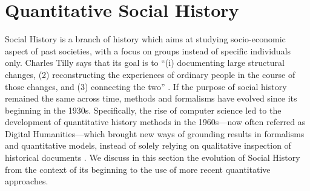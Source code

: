 


\section{Quantitative Social History}\label{sec:social-history}


Social History is a branch of history which aims at studying socio-economic aspect of past societies, with a focus on groups instead of specific individuals only.
Charles Tilly says that its goal is to ``(i) documenting large structural changes, (2) reconstructing the experiences of ordinary people in the course of those changes, and (3) connecting the two'' \cite{tilly1984retrieving}.
If the purpose of social history remained the same across time, methods and formalisms have evolved since its beginning in the 1930s.
Specifically, the rise of computer science led to the development of quantitative history methods in the 1960s---now often referred as Digital Humanities---which brought new ways of grounding results in formalisms and quantitative models, instead of solely relying on qualitative inspection of historical documents \cite{haskinsUnderstandingQuantitativeHistory2011}.
We discuss in this section the evolution of Social History from the context of its beginning to the use of more recent quantitative approaches.




